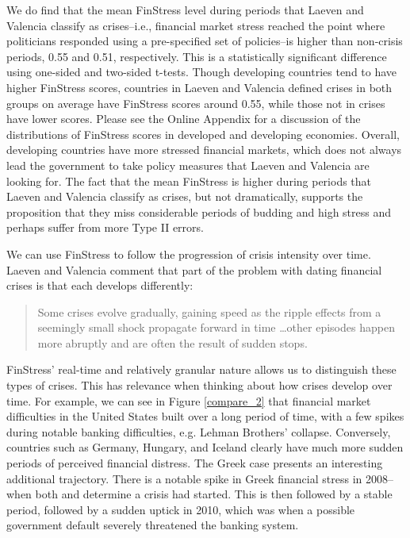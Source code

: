 \documentclass[]{article}
\begin{document}
We do find that the mean FinStress level during periods that Laeven and Valencia classify as crises--i.e., financial market stress reached the point where politicians responded using a pre-specified set of policies--is higher than non-crisis periods, 0.55 and 0.51, respectively. This is a statistically significant difference using one-sided and two-sided t-tests. Though developing countries tend to have higher FinStress scores, countries in Laeven and Valencia defined crises in both groups on average have FinStress scores around 0.55, while those not in crises have lower scores. Please see the Online Appendix for a discussion of the distributions of FinStress scores in developed and developing economies. Overall, developing countries have more stressed financial markets, which does not always lead the government to take policy measures that Laeven and Valencia are looking for. The fact that the mean FinStress is higher during periods that Laeven and Valencia classify as crises, but not dramatically, supports the proposition that they miss considerable periods of budding and high stress and perhaps suffer from more Type II errors.

We can use FinStress to follow the progression of crisis intensity over time. Laeven and Valencia \citeyearpar[227]{laeven2013} comment that part of the problem with dating financial crises is that each develops differently:

\begin{quote}
    Some crises evolve gradually, gaining speed as the ripple effects from a seemingly small shock propagate forward in time \ldots other episodes happen more abruptly and are often the result of sudden stops.
\end{quote}

\noindent FinStress' real-time and relatively granular nature allows us to distinguish these types of crises. This has relevance when thinking about how crises develop over time. For example, we can see in Figure \ref{compare_2} that financial market difficulties in the United States built over a long period of time, with a few spikes during notable banking difficulties, e.g. Lehman Brothers' collapse. Conversely, countries such as Germany, Hungary, and Iceland clearly have much more sudden periods of perceived financial distress. The Greek case presents an interesting additional trajectory. There is a notable spike in Greek financial stress in 2008--when both \cite{Reinhart2009} and \cite{laeven2013} determine a crisis had started. This is then followed by a stable period, followed by a sudden uptick in 2010, which was when a possible government default severely threatened the banking system.
\end{document}
